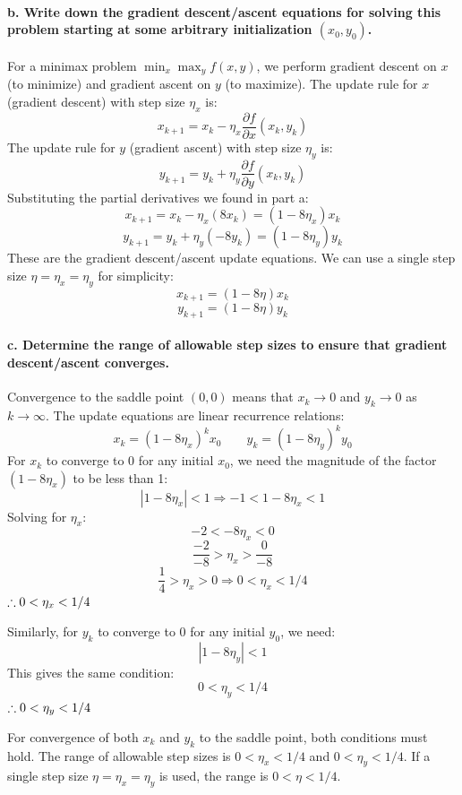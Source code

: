 \documentclass{article}
\begin{document}
\paragraph{b. Write down the gradient descent/ascent equations for solving this problem starting at some arbitrary initialization $(x_0, y_0)$.}

For a minimax problem $\min_x \max_y f(x, y)$, we perform gradient descent on $x$ (to minimize) and gradient ascent on $y$ (to maximize).
The update rule for $x$ (gradient descent) with step size $\eta_x$ is:
$$ x_{k+1} = x_k - \eta_x \frac{\partial f}{\partial x}(x_k, y_k) $$
The update rule for $y$ (gradient ascent) with step size $\eta_y$ is:
$$ y_{k+1} = y_k + \eta_y \frac{\partial f}{\partial y}(x_k, y_k) $$
Substituting the partial derivatives we found in part a:
$$ x_{k+1} = x_k - \eta_x (8x_k) = (1 - 8\eta_x)x_k $$
$$ y_{k+1} = y_k + \eta_y (-8y_k) = (1 - 8\eta_y)y_k $$
These are the gradient descent/ascent update equations. We can use a single step size $\eta = \eta_x = \eta_y$ for simplicity:
$$ x_{k+1} = (1 - 8\eta)x_k $$
$$ y_{k+1} = (1 - 8\eta)y_k $$

\paragraph{c. Determine the range of allowable step sizes to ensure that gradient descent/ascent converges.}

Convergence to the saddle point $(0, 0)$ means that $x_k \to 0$ and $y_k \to 0$ as $k \to \infty$.
The update equations are linear recurrence relations:
$$x_k = (1 - 8\eta_x)^k x_0 \qquad y_k = (1 - 8\eta_y)^k y_0$$
For $x_k$ to converge to 0 for any initial $x_0$, we need the magnitude of the factor $(1 - 8\eta_x)$ to be less than 1:
$$ |1 - 8\eta_x| < 1 \Rightarrow -1 < 1 - 8\eta_x < 1 $$
Solving for $\eta_x$:
$$ -2 < -8\eta_x < 0 $$
$$ \frac{-2}{-8} > \eta_x > \frac{0}{-8} $$
$$ \frac{1}{4} > \eta_x > 0 \Rightarrow 0 < \eta_x < 1/4$$
$\hfill \therefore 0 < \eta_x < 1/4$

\noindent Similarly, for $y_k$ to converge to 0 for any initial $y_0$, we need:
$$ |1 - 8\eta_y| < 1 $$
This gives the same condition:
$$ 0 < \eta_y < 1/4 $$
$\hfill \therefore 0 < \eta_y < 1/4$

\noindent For convergence of both $x_k$ and $y_k$ to the saddle point, both conditions must hold. The range of allowable step sizes is $0 < \eta_x < 1/4$ and $0 < \eta_y < 1/4$.
If a single step size $\eta = \eta_x = \eta_y$ is used, the range is $0 < \eta < 1/4$.
\end{document}
